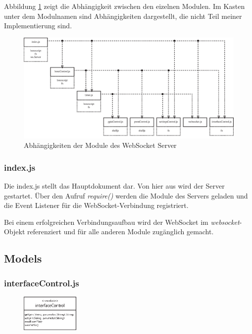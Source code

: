 Abbildung \ref{fig:wssDependencies} zeigt die Abhängigkeit zwischen den eizelnen Modulen. Im Kasten unter dem Modulnamen sind Abhängigkeiten dargestellt, die nicht Teil meiner Implementierung sind.

\begin{figure}[ht]
  \centering
  \includegraphics[width = \textwidth]{documentation/images/wssDependencies.eps}
  \caption{Abhängigkeiten der Module des WebSocket Server}
  \label{fig:wssDependencies}
\end{figure}

\subsubsection{index.js}
Die index.js stellt das Hauptdokument dar. Von hier aus wird der Server gestartet. Über den Aufruf \textit{require()} werden die Module des Servers geladen und die Event Listener für die WebSocket-Verbindung registriert.

Bei einem erfolgreichen Verbindungsaufbau wird der WebSocket im \textit{websocket}-Objekt referenziert und für alle anderen Module zugänglich gemacht.


\subsection{Models}

\subsubsection{interfaceControl.js}
\begin{figure}
  \vspace{-16pt}
  \centering
  \includegraphics[width = 0.25\textwidth]{documentation/images/apiInterfaceControl.eps}
\end{figure}

